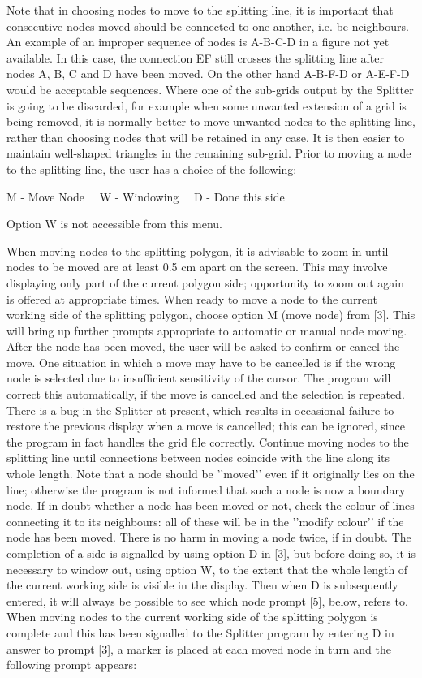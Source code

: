 \documentclass{article}
\begin{document}
Note that in choosing nodes to move to the splitting line, it is important that consecutive nodes moved should be connected to one another, i.e. be neighbours. An example of an improper sequence of nodes is A-B-C-D in a figure not yet available. In this case, the connection EF still crosses the splitting line after nodes A, B, C and D have been moved. On the other hand A-B-F-D or A-E-F-D would be acceptable sequences. Where one of the sub-grids output by the Splitter is going to be discarded, for example when some unwanted extension of a grid is being removed, it is normally better to move unwanted nodes to the splitting line, rather than choosing nodes that will be retained in any case. It is then easier to maintain well-shaped triangles in the remaining sub-grid. Prior to moving a node to the splitting line, the user has a choice of the following:

M - Move Node \ \ W - Windowing \ \ D - Done this side

Option W is not accessible from this menu.

When moving nodes to the splitting polygon, it is advisable to zoom in until nodes to be moved are at least 0.5 cm apart on the screen. This may involve displaying only part of the current polygon side; opportunity to zoom out again is offered at appropriate times. When ready to move a node to the current working side of the splitting polygon, choose option M (move node) from [3]. This will bring up further prompts appropriate to automatic or manual node moving. After the node has been moved, the user will be asked to confirm or cancel the move. One situation in which a move may have to be cancelled is if the wrong node is selected due to insufficient sensitivity of the cursor. The program will correct this automatically, if the move is cancelled and the selection is repeated. There is a bug in the Splitter at present, which results in occasional failure to restore the previous display when a move is cancelled; this can be ignored, since the program in fact handles the grid file correctly. Continue moving 
nodes to the splitting line until connections between nodes coincide with the line along its whole length. Note that a node should be '{}'moved'{}' even if it originally lies on the line; otherwise the program is not informed that such a node is now a boundary node. If in doubt whether a node has been moved or not, check the colour of lines connecting it to its neighbours: all of these will be in the '{}'modify colour'{}' if the node has been moved. There is no harm in moving a node twice, if in doubt. The completion of a side is signalled by using option D in [3], but before doing so, it is necessary to window out, using option W, to the extent that the whole length of the current working side is visible in the display. Then when D is subsequently entered, it will always be possible to see which node prompt [5], below, refers to. When moving nodes to the current working side of the splitting polygon is complete and this has been signalled to the Splitter program by entering D in answer to prompt [3], a 
marker is placed at each moved node in turn and the following prompt appears:
\end{document}
